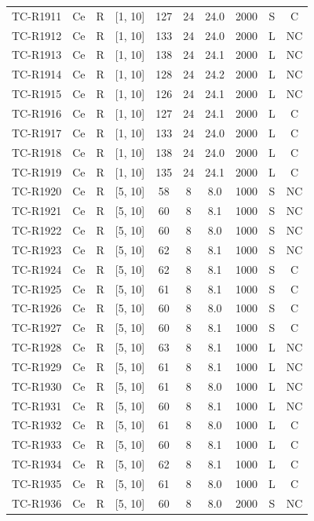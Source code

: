 \begin{longtable}{lccccccccc}
TC-R1911 & Ce & R & [1, 10] & 127 & 24 & 24.0 & 2000 & S & C \\
TC-R1912 & Ce & R & [1, 10] & 133 & 24 & 24.0 & 2000 & L & NC \\
TC-R1913 & Ce & R & [1, 10] & 138 & 24 & 24.1 & 2000 & L & NC \\
TC-R1914 & Ce & R & [1, 10] & 128 & 24 & 24.2 & 2000 & L & NC \\
TC-R1915 & Ce & R & [1, 10] & 126 & 24 & 24.1 & 2000 & L & NC \\
TC-R1916 & Ce & R & [1, 10] & 127 & 24 & 24.1 & 2000 & L & C \\
TC-R1917 & Ce & R & [1, 10] & 133 & 24 & 24.0 & 2000 & L & C \\
TC-R1918 & Ce & R & [1, 10] & 138 & 24 & 24.0 & 2000 & L & C \\
TC-R1919 & Ce & R & [1, 10] & 135 & 24 & 24.1 & 2000 & L & C \\
TC-R1920 & Ce & R & [5, 10] & 58 & 8 & 8.0 & 1000 & S & NC \\
TC-R1921 & Ce & R & [5, 10] & 60 & 8 & 8.1 & 1000 & S & NC \\
TC-R1922 & Ce & R & [5, 10] & 60 & 8 & 8.0 & 1000 & S & NC \\
TC-R1923 & Ce & R & [5, 10] & 62 & 8 & 8.1 & 1000 & S & NC \\
TC-R1924 & Ce & R & [5, 10] & 62 & 8 & 8.1 & 1000 & S & C \\
TC-R1925 & Ce & R & [5, 10] & 61 & 8 & 8.1 & 1000 & S & C \\
TC-R1926 & Ce & R & [5, 10] & 60 & 8 & 8.0 & 1000 & S & C \\
TC-R1927 & Ce & R & [5, 10] & 60 & 8 & 8.1 & 1000 & S & C \\
TC-R1928 & Ce & R & [5, 10] & 63 & 8 & 8.1 & 1000 & L & NC \\
TC-R1929 & Ce & R & [5, 10] & 61 & 8 & 8.1 & 1000 & L & NC \\
TC-R1930 & Ce & R & [5, 10] & 61 & 8 & 8.0 & 1000 & L & NC \\
TC-R1931 & Ce & R & [5, 10] & 60 & 8 & 8.1 & 1000 & L & NC \\
TC-R1932 & Ce & R & [5, 10] & 61 & 8 & 8.0 & 1000 & L & C \\
TC-R1933 & Ce & R & [5, 10] & 60 & 8 & 8.1 & 1000 & L & C \\
TC-R1934 & Ce & R & [5, 10] & 62 & 8 & 8.1 & 1000 & L & C \\
TC-R1935 & Ce & R & [5, 10] & 61 & 8 & 8.0 & 1000 & L & C \\
TC-R1936 & Ce & R & [5, 10] & 60 & 8 & 8.0 & 2000 & S & NC \\

\end{longtable}
